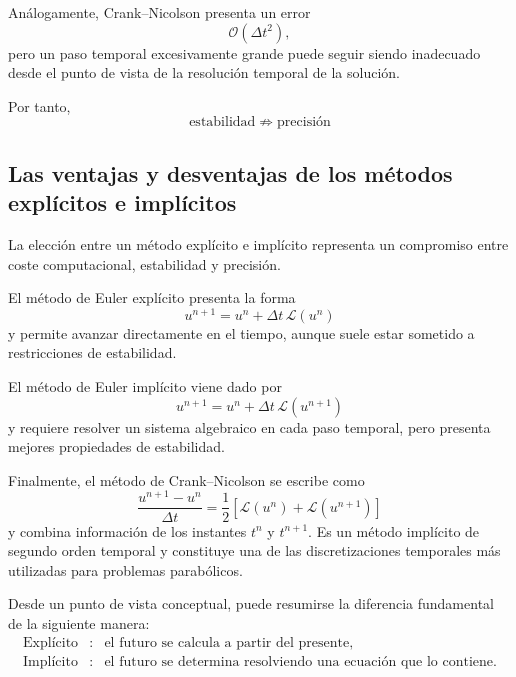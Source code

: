 \documentclass[12pt]{article}
\begin{document}
Análogamente, Crank--Nicolson presenta un error
\begin{equation}
    \mathcal{O}(\Delta t^2),
\end{equation}
pero un paso temporal excesivamente grande puede seguir siendo inadecuado desde el punto de vista de la resolución temporal de la solución.

Por tanto,
\begin{equation}
    \boxed{
    \text{estabilidad}
    \;\not\Rightarrow\;
    \text{precisión}
    }
\end{equation}

\subsection*{Las ventajas y desventajas de los métodos explícitos e implícitos}

La elección entre un método explícito e implícito representa un compromiso entre coste computacional, estabilidad y precisión.

El método de Euler explícito presenta la forma
\begin{equation}
    \boxed{
    u^{n+1}
    =
    u^n
    +
    \Delta t\,
    \mathcal{L}(u^n)
    }
\end{equation}
y permite avanzar directamente en el tiempo, aunque suele estar sometido a restricciones de estabilidad.

El método de Euler implícito viene dado por
\begin{equation}
    \boxed{
    u^{n+1}
    =
    u^n
    +
    \Delta t\,
    \mathcal{L}(u^{n+1})
    }
\end{equation}
y requiere resolver un sistema algebraico en cada paso temporal, pero presenta mejores propiedades de estabilidad.

Finalmente, el método de Crank--Nicolson se escribe como
\begin{equation}
    \boxed{
    \frac{u^{n+1}-u^n}{\Delta t}
    =
    \frac{1}{2}
    \left[
        \mathcal{L}(u^n)
        +
        \mathcal{L}(u^{n+1})
    \right]
    }
\end{equation}
y combina información de los instantes $t^n$ y $t^{n+1}$. Es un método implícito de segundo orden temporal y constituye una de las discretizaciones temporales más utilizadas para problemas parabólicos.

Desde un punto de vista conceptual, puede resumirse la diferencia fundamental de la siguiente manera:
\begin{equation}
    \boxed{
    \begin{array}{ccl}
        \text{Explícito}
        &:&
        \text{el futuro se calcula a partir del presente},
        \\[0.2cm]
        \text{Implícito}
        &:&
        \text{el futuro se determina resolviendo una ecuación que lo contiene}.
    \end{array}
    }
\end{equation}
\end{document}
